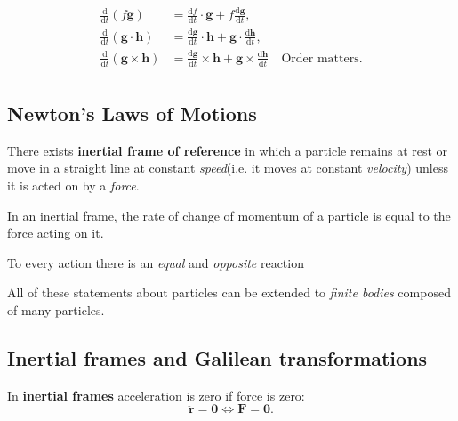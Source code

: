 \begin{proposition}\label{prop:product rules}
\begin{align*}
    \frac{\mathrm{d}}{\mathrm{d}t}(f\mathbf{g}) &= \frac{\mathrm{d}f}{\mathrm{d}t} \cdot \mathbf{g} + f \frac{\mathrm{d}\mathbf{g}}{\mathrm{d}t},\\
    \frac{\mathrm{d}}{\mathrm{d}t}(\mathbf{g} \cdot \mathbf{h}) &= \frac{\mathrm{d}\mathbf{g}}{\mathrm{d}t} \cdot \mathbf{h} + \mathbf{g} \cdot \frac{\mathrm{d}\mathbf{h}}{\mathrm{d}t},\\ 
    \frac{\mathrm{d}}{\mathrm{d}t}(\mathbf{g} \times \mathbf{h}) &= \frac{\mathrm{d}\mathbf{g}}{\mathrm{d}t} \times \mathbf{h} + \mathbf{g} \times \frac{\mathrm{d}\mathbf{h}}{\mathrm{d}t}\quad\text{Order matters}.\\
\end{align*}
\end{proposition}
\subsection{Newton's Laws of Motions}
\begin{law}
    There exists \textbf{inertial frame of reference} in which a particle remains at rest or move in a straight line at constant \textit{speed}(i.e. it moves at constant \textit{velocity}) unless it is acted on by a \textit{force}.
\end{law}
\begin{law}
    In an inertial frame, the rate of change of momentum of a particle is equal to the force acting on it.
\end{law}
\begin{law}
    To every action there is an \textit{equal} and \textit{opposite} reaction
\end{law}
\begin{note}
    All of these statements about particles can be extended to \textit{finite bodies} composed of many particles.
\end{note}

\subsection{Inertial frames and Galilean transformations}
\begin{definition}
    In \textbf{inertial frames} acceleration is zero if force is zero:
    \[
        \ddot{\mathbf{r}}=\mathbf{0} \Longleftrightarrow \mathbf{F} = \mathbf{0}.
    \]
\end{definition}

